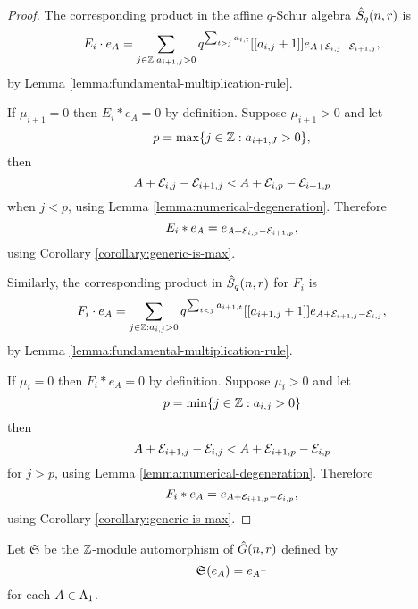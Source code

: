 \documentclass[a4paper, 11pt, twoside]{report}
\begin{document}
\begin{proof}
The corresponding product in the affine $q$-Schur algebra $\hat{S}_q(n,r)$ is
\begin{equation*}
E_i\cdot e_A = \sum_{j\in\mathbb{Z}:a_{i+1,j}>0} q^{\sum_{t>j} a_{i,t}}[[a_{i,j}+1]]e_{A+\mathcal{E}_{i,j}-\mathcal{E}_{i+1,j}},
\end{equation*}
by Lemma \ref{lemma:fundamental-multiplication-rule}.

If $\mu_{i+1}=0$ then $E_i\ast e_A=0$ by definition. Suppose $\mu_{i+1}>0$ and let
\begin{equation*}
p = \max\{j\in\mathbb{Z}: a_{i+1,J}>0\},
\end{equation*}
then
\begin{equation*}
A+\mathcal{E}_{i,j}-\mathcal{E}_{i+1,j} < A+\mathcal{E}_{i,p}-\mathcal{E}_{i+1,p}
\end{equation*}
when $j<p$, using Lemma \ref{lemma:numerical-degeneration}. Therefore
\begin{equation*}
E_i\ast e_A = e_{A+\mathcal{E}_{i,p}-\mathcal{E}_{i+1,p}},
\end{equation*}
using Corollary \ref{corollary:generic-is-max}.

Similarly, the corresponding product in $\hat{S}_q(n,r)$ for $F_i$ is
\begin{equation*}
F_i\cdot e_A = \sum_{j\in\mathbb{Z}:a_{i,j}>0} q^{\sum_{t<j} a_{i+1,t}}[[a_{i+1,j}+1]] e_{A+\mathcal{E}_{i+1,j}-\mathcal{E}_{i,j}},
\end{equation*}
by Lemma \ref{lemma:fundamental-multiplication-rule}.

If $\mu_i=0$ then $F_i\ast e_A = 0$ by definition. Suppose $\mu_i>0$ and let
\begin{equation*}
p = \min\{j\in\mathbb{Z}:a_{i,j}>0\}
\end{equation*}
then
\begin{equation*}
A+\mathcal{E}_{i+1,j}-\mathcal{E}_{i,j} < A+\mathcal{E}_{i+1,p}-\mathcal{E}_{i,p}
\end{equation*}
for $j>p$, using Lemma \ref{lemma:numerical-degeneration}. Therefore
\begin{equation*}
F_i\ast e_A = e_{A+\mathcal{E}_{i+1,p}-\mathcal{E}_{i,p}},
\end{equation*}
using Corollary \ref{corollary:generic-is-max}.
\end{proof}

Let $\mathfrak{S}$ be the $\mathbb{Z}$-module automorphism of $\hat{G}(n,r)$ defined by
\begin{equation*}
\mathfrak{S}{(e_A)}=e_{A^\top}
\end{equation*}
for each $A\in\Lambda_1{}$.
\end{document}
